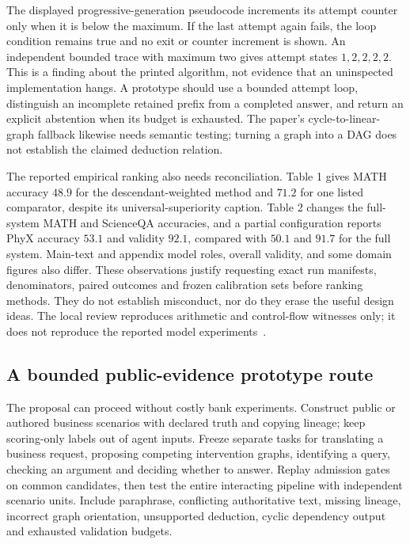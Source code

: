 The displayed progressive-generation pseudocode increments its attempt
counter only when it is below the maximum. If the last attempt again fails,
the loop condition remains true and no exit or counter increment is shown.
An independent bounded trace with maximum two gives attempt states
$1,2,2,2,2$. This is a finding about the printed algorithm, not evidence that
an uninspected implementation hangs. A prototype should use a bounded
attempt loop, distinguish an incomplete retained prefix from a completed
answer, and return an explicit abstention when its budget is exhausted.
The paper's cycle-to-linear-graph fallback likewise needs semantic testing;
turning a graph into a DAG does not establish the claimed deduction relation.

The reported empirical ranking also needs reconciliation. Table 1 gives
MATH accuracy $48.9$ for the descendant-weighted method and $71.2$ for one
listed comparator, despite its universal-superiority caption. Table 2 changes
the full-system MATH and ScienceQA accuracies, and a partial configuration
reports PhyX accuracy $53.1$ and validity $92.1$, compared with $50.1$ and
$91.7$ for the full system. Main-text and appendix model roles, overall
validity, and some domain figures also differ. These observations justify
requesting exact run manifests, denominators, paired outcomes and frozen
calibration sets before ranking methods. They do not establish misconduct,
nor do they erase the useful design ideas. The local review reproduces
arithmetic and control-flow witnesses only; it does not reproduce the
reported model experiments~\citep{exec23_scientific_conformal,exec23_admission_conformal_reference}.

\subsection{A bounded public-evidence prototype route}
\label{exec23:admit-route}
The proposal can proceed without costly bank experiments. Construct public
or authored business scenarios with declared truth and copying lineage; keep
scoring-only labels out of agent inputs. Freeze separate tasks for translating
a business request, proposing competing intervention graphs, identifying a
query, checking an argument and deciding whether to answer. Replay admission
gates on common candidates, then test the entire interacting pipeline with
independent scenario units. Include paraphrase, conflicting authoritative
text, missing lineage, incorrect graph orientation, unsupported deduction,
cyclic dependency output and exhausted validation budgets.

